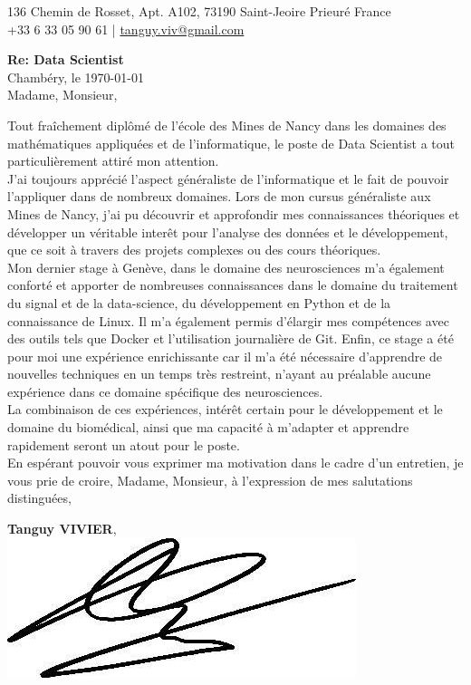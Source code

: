 \documentclass[]{cv-style}
\begin{document}
\huge
{}       %
\vspace{-0.9cm}
%
\begin{center}
    \large
    136 Chemin de Rosset, Apt. A102, 73190 Saint-Jeoire Prieuré France \\
    +33 6 33 05 90 61 | \href{tanguy.viv@gmail.com}{tanguy.viv@gmail.com}
\end{center}
%
\vspace{1.5cm}
\begin{flushleft}
    \large
    \textbf{Re: Data Scientist} \\[0.2cm]
    Chambéry, le \today \\[1cm]
    Madame, Monsieur,
\end{flushleft}
\vspace{0.4cm}
\large
Tout fraîchement diplômé de l'école des Mines de Nancy dans les domaines des
mathématiques appliquées et de l'informatique, le poste de Data Scientist a 
tout particulièrement attiré mon attention. \\[0.5cm]
%
J'ai toujours apprécié l'aspect généraliste de l'informatique et le fait
de pouvoir l'appliquer dans de nombreux domaines. Lors de mon cursus 
généraliste aux Mines de Nancy, j'ai pu découvrir et approfondir mes
connaissances théoriques et développer un véritable interêt pour l'analyse
des données et le développement, que ce soit à travers des projets complexes
ou des cours théoriques. \\[0.5cm]
%
Mon dernier stage à Genève, dans le domaine des neurosciences m'a également
conforté et apporter de nombreuses connaissances dans le domaine du traitement
du signal et de la data-science, du développement en Python et de la
connaissance de Linux. Il m'a également permis d'élargir mes compétences avec
des outils tels que Docker et l'utilisation journalière de Git. Enfin, ce stage
a été pour moi une expérience enrichissante car il m'a été nécessaire
d'apprendre de nouvelles techniques en un temps très restreint, n'ayant au
préalable aucune expérience dans ce domaine spécifique des neurosciences.
\\[0.5cm]
%
La combinaison de ces expériences, intérêt certain pour le développement et
le domaine du biomédical, ainsi que ma capacité à m'adapter et apprendre
rapidement seront un atout pour le poste. \\[0.5cm]
%
En espérant pouvoir vous exprimer ma motivation dans le cadre d’un entretien,
je vous prie de croire, Madame, Monsieur, à l’expression de mes salutations
distinguées, \\[0.5cm]
%
\begin{flushright}
\parbox{5cm}{
\centering
    \textbf{Tanguy VIVIER},\\
    \hspace{2cm}\includegraphics[scale=0.4]{signature.jpg}
}
\end{flushright}
\end{document}

